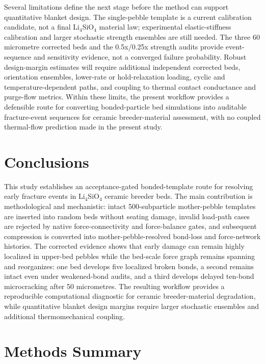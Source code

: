 \documentclass[5p,twocolumn]{elsarticle}
\begin{document}
Several limitations define the next stage before the method can support quantitative blanket design. The single-pebble template is a current calibration candidate, not a final Li$_4$SiO$_4$ material law; experimental elastic-stiffness calibration and larger stochastic strength ensembles are still needed. The three 60 micrometre corrected beds and the 0.5x/0.25x strength audits provide event-sequence and sensitivity evidence, not a converged failure probability. Robust design-margin estimates will require additional independent corrected beds, orientation ensembles, lower-rate or hold-relaxation loading, cyclic and temperature-dependent paths, and coupling to thermal contact conductance and purge-flow metrics. Within these limits, the present workflow provides a defensible route for converting bonded-particle bed simulations into auditable fracture-event sequences for ceramic breeder-material assessment, with no coupled thermal-flow prediction made in the present study.


\section{Conclusions}

This study establishes an acceptance-gated bonded-template route for resolving early fracture events in Li$_4$SiO$_4$ ceramic breeder beds. The main contribution is methodological and mechanistic: intact 500-subparticle mother-pebble templates are inserted into random beds without seating damage, invalid load-path cases are rejected by native force-connectivity and force-balance gates, and subsequent compression is converted into mother-pebble-resolved bond-loss and force-network histories. The corrected evidence shows that early damage can remain highly localized in upper-bed pebbles while the bed-scale force graph remains spanning and reorganizes: one bed develops five localized broken bonds, a second remains intact even under weakened-bond audits, and a third develops delayed ten-bond microcracking after 50 micrometres. The resulting workflow provides a reproducible computational diagnostic for ceramic breeder-material degradation, while quantitative blanket design margins require larger stochastic ensembles and additional thermomechanical coupling.


\section{Methods Summary}
\end{document}
